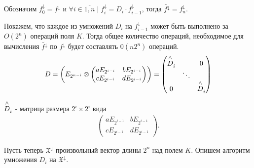 Обозначим $f_0^\downarrow = f^\downarrow$ и $\forall i \in \overline{1,n} \mid f_i^\downarrow = D_i \cdot f_{i-1}^\downarrow$, тогда $\widetilde{f^\downarrow} = f_n^\downarrow$.

Покажем, что каждое из умножений $D_i$ на $f_{i-1}^\downarrow$ может быть выполнено за $O(2^n)$ операций поля $K$. Тогда общее количество операций, 
необходимое для вычисления $\widetilde{f^\downarrow}$ по $f^\downarrow$ будет составлять $0(n2^n)$ операций.
\begin{align*}
    D = \left( E_{2^{n-i}} \otimes
    \begin{pmatrix}
        aE_{2^{i-i}} & bE_{2^{i-i}}\\
        cE_{2^{i-i}} & dE_{2^{i-i}}
    \end{pmatrix}
    \right)
    =
    \begin{pmatrix}
        \overset{\wedge}{\mathstrut D}_i &  & 0 \\
        & \ddots & \\
        0 & & \overset{\wedge}{\mathstrut D}_i
    \end{pmatrix}
\end{align*}

$\overset{\wedge}{\mathstrut D}_i$ - матрица размера $2^i \times 2^i$ вида
\begin{align*}
    \begin{pmatrix}
        aE_{2^{i-1}} & bE_{2^{i-1}}\\
        cE_{2^{i-1}} & dE_{2^{i-1}}
    \end{pmatrix}.
\end{align*}

Пусть теперь $\mathfrak{X}^\downarrow$ произвольный вектор длины $2^n$ над полем $K$. Опишем алгоритм умножения $D_i$ на $\mathfrak{X}^\downarrow$.

